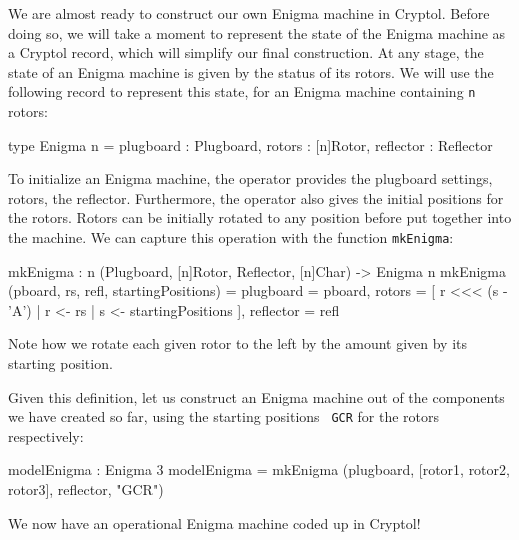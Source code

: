 We are almost ready to construct our own Enigma machine in
Cryptol. Before doing so, we will take a moment to represent the state
of the Enigma machine as a Cryptol record\indTheRecordType, which will
simplify our final construction. At any stage, the state of an Enigma
machine is given by the status of its rotors. We will use the
following record to represent this state, for an Enigma machine
containing \texttt{n} rotors:
\begin{code}
  type Enigma n = { plugboard : Plugboard,
                    rotors    : [n]Rotor,
                    reflector : Reflector
                  }
\end{code}
To initialize an Enigma machine, the operator provides the plugboard
settings, rotors, the reflector. Furthermore, the operator also gives
the initial positions for the rotors.  Rotors can be initially rotated
to any position before put together into the machine. We can capture
this operation with the function {\tt mkEnigma}:
\begin{code}
  mkEnigma : {n} (Plugboard, [n]Rotor, Reflector, [n]Char) 
                 -> Enigma n
  mkEnigma (pboard, rs, refl, startingPositions) =
      { plugboard  = pboard,
        rotors     = [ r <<< (s - 'A')
                     | r <- rs
                     | s <- startingPositions
                     ],
        reflector  = refl
      }
\end{code}
Note how we rotate each given rotor to the left by the amount given by
its starting position.


Given this definition, let us construct an Enigma machine out of the
components we have created so far, using the starting positions {\tt
  GCR} for the rotors respectively:\label{def:modelEnigma}
\begin{code}
  modelEnigma : Enigma 3
  modelEnigma = mkEnigma (plugboard, [rotor1, rotor2, rotor3], 
                          reflector, "GCR")
\end{code}
We now have an operational Enigma machine coded up in Cryptol!


